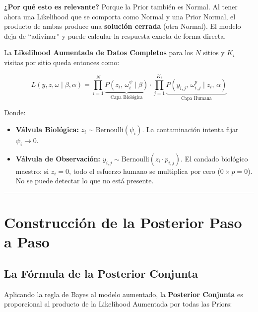 \documentclass[12pt, a4paper]{article}
\begin{document}
\begin{notabox}
\small \textbf{¿Por qué esto es relevante?} Porque la Prior también es Normal. Al tener ahora una Likelihood que se comporta como Normal y una Prior Normal, el producto de ambas produce una \textbf{solución cerrada} (otra Normal). El modelo deja de ``adivinar'' y puede calcular la respuesta exacta de forma directa.
\end{notabox}

La \textbf{Likelihood Aumentada de Datos Completos} para los $N$ sitios y $K_i$ visitas por sitio queda entonces como:

\begin{equation}
  L\!\left(y, z, \omega \mid \beta, \alpha\right)
  = \prod_{i=1}^N
    \underbrace{P\!\left(z_i,\, \omega^\psi_i \mid \beta\right)}_{\text{Capa Biológica}}
    \cdot
    \prod_{j=1}^{K_i}
    \underbrace{P\!\left(y_{i,j},\, \omega^p_{i,j} \mid z_i,\, \alpha\right)}_{\text{Capa Humana}}
\end{equation}

Donde:
\begin{itemize}
  \item \textbf{Válvula Biológica:} $z_i \sim \text{Bernoulli}(\psi_i)$. La contaminación intenta fijar $\psi_i \to 0$.
  \item \textbf{Válvula de Observación:} $y_{i,j} \sim \text{Bernoulli}(z_i \cdot p_{i,j})$. El candado biológico maestro: si $z_i = 0$, todo el esfuerzo humano se multiplica por cero ($0 \times p = 0$). No se puede detectar lo que no está presente.
\end{itemize}

\hrule
\vspace{1em}

\section{Construcción de la Posterior Paso a Paso}

\subsection{La Fórmula de la Posterior Conjunta}

Aplicando la regla de Bayes al modelo aumentado, la \textbf{Posterior Conjunta} es proporcional al producto de la Likelihood Aumentada por todas las Priors:
\end{document}
